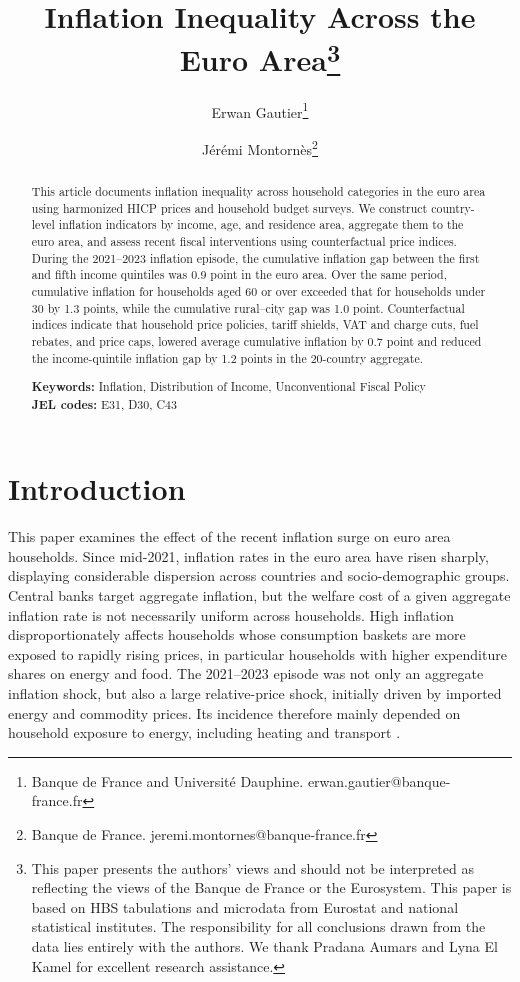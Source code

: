 \documentclass[11pt]{article}
\title{Inflation Inequality Across the Euro Area\thanks{This paper presents the authors' views and should not be interpreted as reflecting the views of
 the Banque de France or the Eurosystem. This paper is based on HBS tabulations and microdata from
 Eurostat and national statistical institutes. The responsibility for all conclusions drawn from the data lies entirely with the
 authors. We thank Pradana Aumars and Lyna El Kamel for excellent research assistance.}}
\author{Erwan Gautier\thanks{\quad Banque de France and Université Dauphine. erwan.gautier@banque-france.fr} \and Jérémi Montornès\thanks{\quad Banque de France. jeremi.montornes@banque-france.fr}}
\begin{document}
\maketitle

\begin{abstract}
This article documents inflation inequality across household categories in the euro area using
harmonized HICP prices and household budget surveys. We construct country-level inflation indicators
by income, age, and residence area, aggregate them to the euro area, and assess recent fiscal
interventions using counterfactual price indices. During the 2021--2023 inflation episode, the
cumulative inflation gap between the first and fifth income quintiles was 0.9 point in the
euro area. Over the same period, cumulative inflation for households aged 60 or over exceeded that
for households under 30 by 1.3 points, while the cumulative rural--city gap was 1.0 point.
Counterfactual indices indicate that household price policies, tariff shields,
VAT and charge cuts, fuel rebates, and price caps, lowered average cumulative inflation by
0.7 point and reduced the
income-quintile inflation gap by 1.2 points in the 20-country aggregate.


\vspace{1em}

\noindent \textbf{Keywords:} Inflation, Distribution of Income, Unconventional Fiscal Policy\\
\noindent \textbf{JEL codes:} E31, D30, C43

\end{abstract}

\newpage



\section*{Introduction}

This paper examines the effect of the recent inflation surge on euro area households. Since
mid-2021, inflation rates in the euro area have risen sharply, displaying considerable dispersion
across countries and socio-demographic groups. Central
banks target aggregate inflation, but the welfare cost of a given aggregate inflation rate is not
necessarily uniform across households. High inflation disproportionately affects households whose
consumption baskets are more exposed to rapidly rising prices, in particular households with higher
expenditure shares on energy and food. The 2021--2023 episode was not only an aggregate inflation
shock, but also a large relative-price shock, initially driven by imported energy and commodity prices. Its
incidence therefore mainly depended on household exposure to energy, including heating and
transport \citep{levell2024distributional}.
\end{document}
